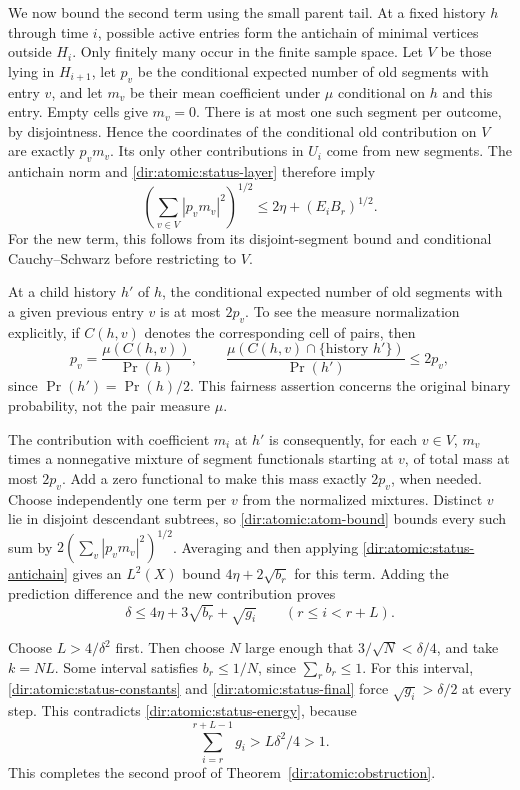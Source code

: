 We now bound the second term using the small parent tail.  At a fixed
history $h$ through time $i$, possible active entries form the antichain
of minimal vertices outside $H_i$.  Only finitely many occur in the
finite sample space.  Let $V$ be those lying in $H_{i+1}$, let $p_v$
be the conditional expected number of old segments with entry $v$, and
let $m_v$ be their mean coefficient under $\mu$ conditional on $h$ and
this entry.  Empty cells give $m_v=0$.  There is at most one such segment
per outcome, by disjointness.  Hence the coordinates of the conditional
old contribution on $V$ are exactly $p_vm_v$.  Its only other
contributions in $U_i$ come from new segments.  The antichain norm and
\eqref{dir:atomic:status-layer} therefore imply
\begin{equation}\label{dir:atomic:status-antichain}
 \left(\sum_{v\in V}|p_vm_v|^2\right)^{1/2}
 \le2\eta+(E_iB_r)^{1/2}.
\end{equation}
For the new term, this follows from its disjoint-segment bound and
conditional Cauchy--Schwarz before restricting to $V$.

At a child history $h'$ of $h$, the conditional expected number of old
segments with a given previous entry $v$ is at most $2p_v$.  To see the
measure normalization explicitly, if $C(h,v)$ denotes the corresponding
cell of pairs, then
\[
 p_v=\frac{\mu(C(h,v))}{\Pr(h)},\qquad
 \frac{\mu(C(h,v)\cap\{\text{history }h'\})}{\Pr(h')}
 \le2p_v,
\]
since $\Pr(h')=\Pr(h)/2$.  This fairness assertion concerns the original
binary probability, not the pair measure $\mu$.

The contribution with coefficient $m_i$ at $h'$ is consequently, for
each $v\in V$, $m_v$ times a nonnegative mixture of segment functionals
starting at $v$, of total mass at most $2p_v$.  Add a zero functional to
make this mass exactly $2p_v$, when needed.  Choose independently one
term per $v$ from the normalized mixtures.  Distinct $v$ lie in disjoint
descendant subtrees, so \eqref{dir:atomic:atom-bound} bounds every such
sum by $2(\sum_v|p_vm_v|^2)^{1/2}$.  Averaging and then applying
\eqref{dir:atomic:status-antichain} gives an $L^2(X)$ bound
$4\eta+2\sqrt{b_r}$ for this term.  Adding the prediction difference
and the new contribution proves
\begin{equation}\label{dir:atomic:status-final}
 \delta\le4\eta+3\sqrt{b_r}+\sqrt{g_i}
 \qquad(r\le i<r+L).
\end{equation}

Choose $L>4/\delta^2$ first.  Then choose $N$ large enough that
$3/\sqrt N<\delta/4$, and take $k=NL$.  Some interval satisfies
$b_r\le1/N$, since $\sum_r b_r\le1$.  For this interval,
\eqref{dir:atomic:status-constants} and \eqref{dir:atomic:status-final}
force $\sqrt{g_i}>\delta/2$ at every step.  This contradicts
\eqref{dir:atomic:status-energy}, because
\[
 \sum_{i=r}^{r+L-1}g_i>L\delta^2/4>1.
\]
This completes the second proof of
Theorem~\ref{dir:atomic:obstruction}.

